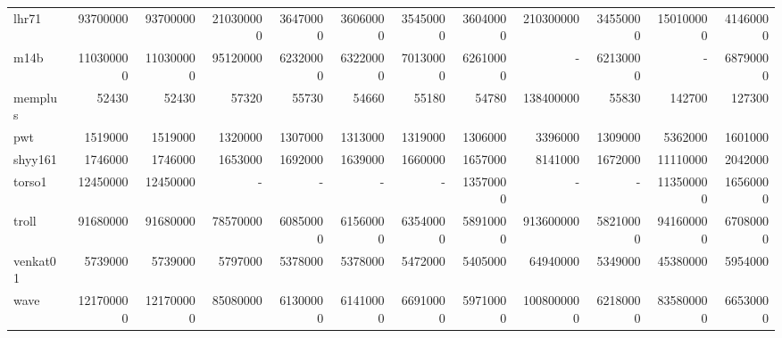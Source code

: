 \begin{table}[h]
{{\begin{tabular}{|l|r|r|r|r|r|r|r|r|r|r|r|}
lhr71 & 93700000 & 93700000 & 210300000 & 36470000 & 36060000 & 35450000 & 36040000 & 210300000 & 34550000 & 150100000 & 41460000 \\
m14b & 110300000 & 110300000 & 95120000 & 62320000 & 63220000 & 70130000 & 62610000 & - & 62130000 & - & 68790000 \\
memplus & 52430 & 52430 & 57320 & 55730 & 54660 & 55180 & 54780 & 138400000 & 55830 & 142700 & 127300 \\
pwt & 1519000 & 1519000 & 1320000 & 1307000 & 1313000 & 1319000 & 1306000 & 3396000 & 1309000 & 5362000 & 1601000 \\
shyy161 & 1746000 & 1746000 & 1653000 & 1692000 & 1639000 & 1660000 & 1657000 & 8141000 & 1672000 & 11110000 & 2042000 \\
torso1 & 12450000 & 12450000 & - & - & - & - & 13570000 & - & - & 113500000 & 16560000 \\
troll & 91680000 & 91680000 & 78570000 & 60850000 & 61560000 & 63540000 & 58910000 & 913600000 & 58210000 & 941600000 & 67080000 \\
venkat01 & 5739000 & 5739000 & 5797000 & 5378000 & 5378000 & 5472000 & 5405000 & 64940000 & 5349000 & 45380000 & 5954000 \\
wave & 121700000 & 121700000 & 85080000 & 61300000 & 61410000 & 66910000 & 59710000 & 1008000000 & 62180000 & 835800000 & 66530000 \\
\hline
\end{tabular}%
}%
}
\end{table}

